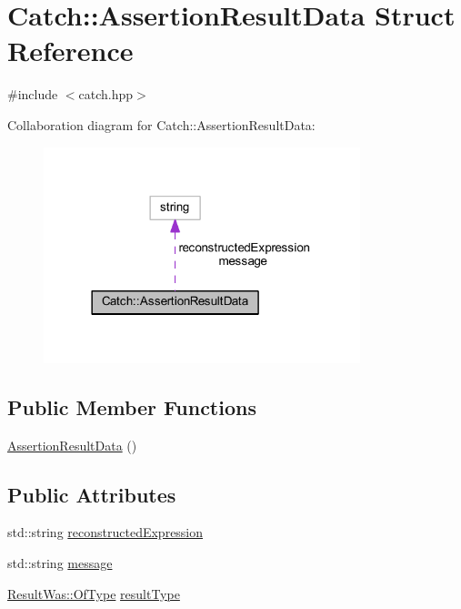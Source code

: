 \hypertarget{struct_catch_1_1_assertion_result_data}{}\section{Catch\+:\+:Assertion\+Result\+Data Struct Reference}
\label{struct_catch_1_1_assertion_result_data}


{\ttfamily \#include $<$catch.\+hpp$>$}



Collaboration diagram for Catch\+:\+:Assertion\+Result\+Data\+:\nopagebreak
\begin{figure}[H]
\begin{center}
\leavevmode
\includegraphics[width=261pt]{struct_catch_1_1_assertion_result_data__coll__graph}
\end{center}
\end{figure}
\subsection*{Public Member Functions}
\begin{DoxyCompactItemize}
\item 
\hyperlink{struct_catch_1_1_assertion_result_data_a37179edde9f853f22d4456677fd97701}{Assertion\+Result\+Data} ()
\end{DoxyCompactItemize}
\subsection*{Public Attributes}
\begin{DoxyCompactItemize}
\item 
std\+::string \hyperlink{struct_catch_1_1_assertion_result_data_a9e809d36fffbeb1c7d0cbe7382dd9595}{reconstructed\+Expression}
\item 
std\+::string \hyperlink{struct_catch_1_1_assertion_result_data_ac34215803c4c4a88f795879f61c1f7b4}{message}
\item 
\hyperlink{struct_catch_1_1_result_was_a624e1ee3661fcf6094ceef1f654601ef}{Result\+Was\+::\+Of\+Type} \hyperlink{struct_catch_1_1_assertion_result_data_a7ceab4a7ff722aec5587e3748caf66b7}{result\+Type}
\end{DoxyCompactItemize}



